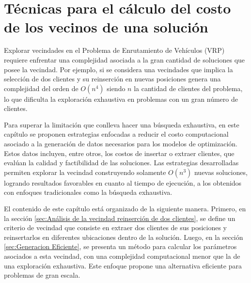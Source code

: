 \documentclass[12pt]{report}
\begin{document}
	\chapter{Técnicas para el cálculo del costo de los vecinos de una solución}

	Explorar vecindades en el Problema de Enrutamiento de Vehículos (VRP) requiere enfrentar una complejidad asociada a la gran cantidad de soluciones que posee la vecindad. Por ejemplo, si se considera una vecindades que implica la selección de dos clientes y su reinserción en nuevas posiciones genera una complejidad del orden de $O(n^4)$ siendo $n$ la cantidad de clientes del problema, lo que dificulta la exploración exhaustiva en problemas con un gran número de clientes.

	Para superar la limitación que conlleva hacer una búsqueda exhaustiva, en este capítulo se proponen estrategias enfocadas a reducir el costo computacional asociado a la generación de datos necesarios para los modelos de optimización. Estos datos incluyen, entre otros, los costos de insertar o extraer clientes, que evalúan la calidad y factibilidad de las soluciones. Las estrategias desarrolladas permiten explorar la vecindad construyendo solamente $O(n^3)$ nuevas soluciones, logrando resultados favorables en cuanto al tiempo de ejecución, a los obtenidos con enfoques tradicionales como la búsqueda exhaustiva.

	El contenido de este capítulo está organizado de la siguiente manera. Primero, en la sección \ref{sec:Análisis de la vecindad reinserción de dos clientes}, se define un criterio de vecindad que consiste en extraer dos clientes de sus posiciones y reinsertarlos en diferentes ubicaciones dentro de la solución. Luego, en la sección \ref{sec:Generacion Eficiente}, se presenta un método para calcular los parámetros asociados a esta vecindad, con una complejidad computacional menor que la de una exploración exhaustiva. Este enfoque propone una alternativa eficiente para problemas de gran escala.
\end{document}
